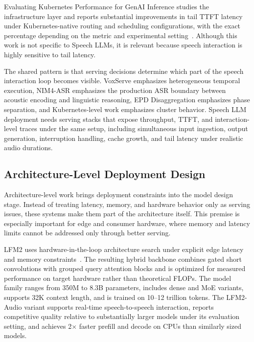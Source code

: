 Evaluating Kubernetes Performance for GenAI Inference studies the infrastructure layer and reports substantial improvements in tail TTFT latency under Kubernetes-native routing and scheduling configurations, with the exact percentage depending on the metric and experimental setting~\citep{malleni2026kubernetes}. Although this work is not specific to Speech LLMs, it is relevant because speech interaction is highly sensitive to tail latency.

The shared pattern is that serving decisions determine which part of the speech interaction loop becomes visible. VoxServe emphasizes heterogeneous temporal execution, NIM4-ASR emphasizes the production ASR boundary between acoustic encoding and linguistic reasoning, EPD Disaggregation emphasizes phase separation, and Kubernetes-level work emphasizes cluster behavior. Speech LLM deployment needs serving stacks that expose throughput, TTFT, and interaction-level traces under the same setup, including simultaneous input ingestion, output generation, interruption handling, cache growth, and tail latency under realistic audio durations.

\subsection{Architecture-Level Deployment Design}

Architecture-level work brings deployment constraints into the model design stage. Instead of treating latency, memory, and hardware behavior only as serving issues, these systems make them part of the architecture itself. This premise is especially important for edge and consumer hardware, where memory and latency limits cannot be addressed only through better serving.

LFM2 uses hardware-in-the-loop architecture search under explicit edge latency and memory constraints~\citep{amini2025lfm2}. The resulting hybrid backbone combines gated short convolutions with grouped query attention blocks and is optimized for measured performance on target hardware rather than theoretical FLOPs. The model family ranges from 350M to 8.3B parameters, includes dense and MoE variants, supports 32K context length, and is trained on 10--12 trillion tokens. The LFM2-Audio variant supports real-time speech-to-speech interaction, reports competitive quality relative to substantially larger models under its evaluation setting, and achieves 2$\times$ faster prefill and decode on CPUs than similarly sized models.

